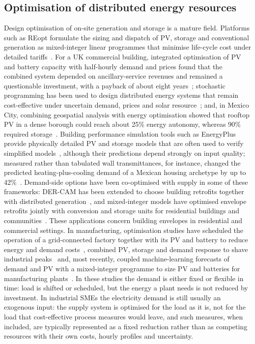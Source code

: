 \documentclass[processes,article,submit,pdftex,moreauthors]{Definitions/mdpi}
\begin{document}
\subsection{Optimisation of distributed energy resources}
Design optimisation of on-site generation and storage is a mature field. Platforms such as REopt formulate the sizing and dispatch of PV, storage and conventional generation as mixed-integer linear programmes that minimise life-cycle cost under detailed tariffs~\cite{cutler2017reopt}. For a UK commercial building, integrated optimisation of PV and battery capacity with half-hourly demand and prices found that the combined system depended on ancillary-service revenues and remained a questionable investment, with a payback of about eight years~\cite{mariaud2017}; stochastic programming has been used to design distributed energy systems that remain cost-effective under uncertain demand, prices and solar resource~\cite{mavromatidis2018}; and, in Mexico City, combining geospatial analysis with energy optimisation showed that rooftop PV in a dense borough could reach about 25\% energy autonomy, whereas 90\% required storage~\cite{gonzalezcarreon2025}. Building performance simulation tools such as EnergyPlus provide physically detailed PV and storage models that are often used to verify simplified models~\cite{crawley2001}, although their predictions depend strongly on input quality; measured rather than tabulated wall transmittances, for instance, changed the predicted heating-plus-cooling demand of a Mexican housing archetype by up to 42\%~\cite{garciakerdan2026uvalue}. Demand-side options have been co-optimised with supply in some of these frameworks: DER-CAM has been extended to choose building retrofits together with distributed generation~\cite{stadler2014dercam}, and mixed-integer models have optimised envelope retrofits jointly with conversion and storage units for residential buildings and communities~\cite{wu2017retrofit,schutz2017milp}. These applications concern building envelopes in residential and commercial settings. In manufacturing, optimisation studies have scheduled the operation of a grid-connected factory together with its PV and battery to reduce energy and demand costs~\cite{zhang2017factory}, combined PV, storage and demand response to shave industrial peaks~\cite{zahari2023dsm,zahari2024peak} and, most recently, coupled machine-learning forecasts of demand and PV with a mixed-integer programme to size PV and batteries for manufacturing plants~\cite{georgiadis2025mlmilp}. In these studies the demand is either fixed or flexible in time: load is shifted or scheduled, but the energy a plant needs is not reduced by investment. In industrial SMEs the electricity demand is still usually an exogenous input: the supply system is optimised for the load as it is, not for the load that cost-effective process measures would leave, and such measures, when included, are typically represented as a fixed reduction rather than as competing resources with their own costs, hourly profiles and uncertainty.
\end{document}
